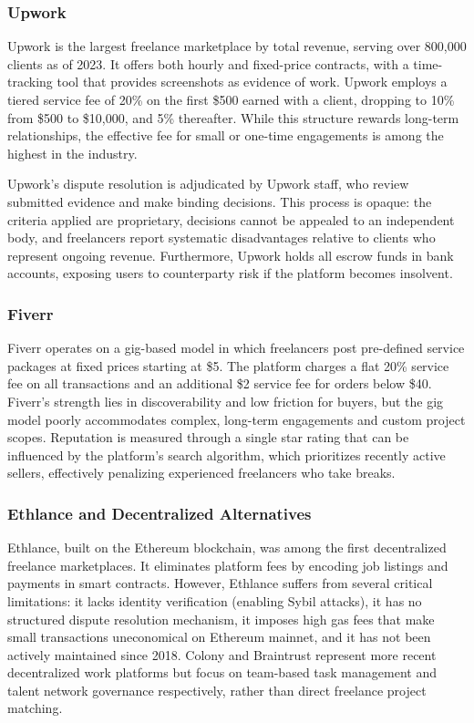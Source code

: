 \subsubsection{Upwork}

Upwork is the largest freelance marketplace by total revenue, serving over 800,000 clients as of 2023. It offers both hourly and fixed-price contracts, with a time-tracking tool that provides screenshots as evidence of work. Upwork employs a tiered service fee of 20\% on the first \$500 earned with a client, dropping to 10\% from \$500 to \$10,000, and 5\% thereafter. While this structure rewards long-term relationships, the effective fee for small or one-time engagements is among the highest in the industry.

Upwork's dispute resolution is adjudicated by Upwork staff, who review submitted evidence and make binding decisions. This process is opaque: the criteria applied are proprietary, decisions cannot be appealed to an independent body, and freelancers report systematic disadvantages relative to clients who represent ongoing revenue. Furthermore, Upwork holds all escrow funds in bank accounts, exposing users to counterparty risk if the platform becomes insolvent.

\subsubsection{Fiverr}

Fiverr operates on a gig-based model in which freelancers post pre-defined service packages at fixed prices starting at \$5. The platform charges a flat 20\% service fee on all transactions and an additional \$2 service fee for orders below \$40. Fiverr's strength lies in discoverability and low friction for buyers, but the gig model poorly accommodates complex, long-term engagements and custom project scopes. Reputation is measured through a single star rating that can be influenced by the platform's search algorithm, which prioritizes recently active sellers, effectively penalizing experienced freelancers who take breaks.

\subsubsection{Ethlance and Decentralized Alternatives}

Ethlance, built on the Ethereum blockchain, was among the first decentralized freelance marketplaces. It eliminates platform fees by encoding job listings and payments in smart contracts. However, Ethlance suffers from several critical limitations: it lacks identity verification (enabling Sybil attacks), it has no structured dispute resolution mechanism, it imposes high gas fees that make small transactions uneconomical on Ethereum mainnet, and it has not been actively maintained since 2018. Colony and Braintrust represent more recent decentralized work platforms but focus on team-based task management and talent network governance respectively, rather than direct freelance project matching.

